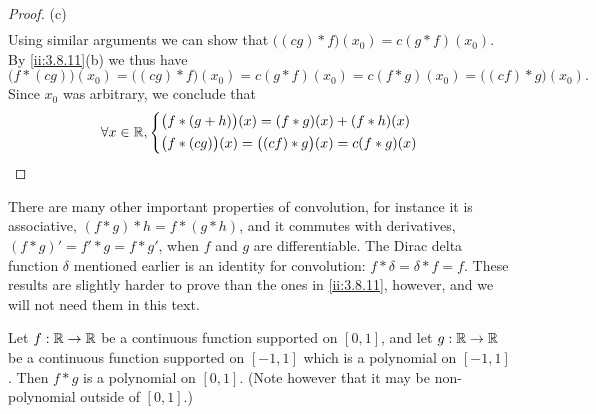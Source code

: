 \begin{proof}{(c)}
\begin{align*}
  \end{align*}
  Using similar arguments we can show that \(\big((cg) * f\big)(x_0) = c (g * f)(x_0)\).
  By \cref{ii:3.8.11}(b) we thus have
  \[
    \big(f * (cg)\big)(x_0) = \big((cg) * f\big)(x_0) = c(g * f)(x_0) = c(f * g)(x_0) = \big((cf) * g\big)(x_0).
  \]
  Since \(x_0\) was arbitrary, we conclude that
  \[
    \forall x \in \mathbb{R}, \begin{dcases}
      \big(f * (g + h)\big)(x) = (f * g)(x) + (f * h)(x) \\
      \big(f * (cg)\big)(x) = \big((cf) * g\big)(x) = c(f * g)(x)
    \end{dcases}
  \]
\end{proof}

\begin{rmk}\label{ii:3.8.12}
  There are many other important properties of convolution, for instance it is associative, \((f * g) * h = f * (g * h)\), and it commutes with derivatives, \((f * g)' = f' * g = f * g'\), when \(f\) and \(g\) are differentiable.
  The Dirac delta function \(\delta\) mentioned earlier is an identity for convolution:
  \(f * \delta = \delta * f = f\).
  These results are slightly harder to prove than the ones in \cref{ii:3.8.11}, however, and we will not need them in this text.
\end{rmk}

\begin{lem}\label{ii:3.8.13}
  Let \(f : \mathbb{R} \to \mathbb{R}\) be a continuous function supported on \([0, 1]\), and let \(g : \mathbb{R} \to \mathbb{R}\) be a continuous function supported on \([-1, 1]\) which is a polynomial on \([-1, 1]\).
  Then \(f * g\) is a polynomial on \([0, 1]\).
  (Note however that it may be non-polynomial outside of \([0, 1].\))
\end{lem}

